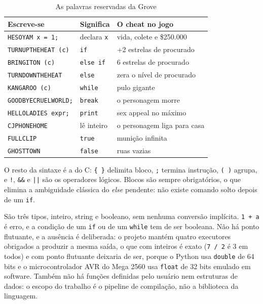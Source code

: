 \documentclass[conference]{IEEEtran}
\begin{document}
\begin{table}[htbp]
\caption{As palavras reservadas da Grove}
\label{tab:cheats}
\centering
\footnotesize
\setlength{\tabcolsep}{3pt}
\begin{tabular}{@{}lll@{}}
\toprule
\textbf{Escreve-se} & \textbf{Significa} & \textbf{O cheat no jogo} \\
\midrule
\texttt{HESOYAM x = 1;} & declara \texttt{x} & vida, colete e \$250.000 \\
\texttt{TURNUPTHEHEAT (c)} & \texttt{if} & +2 estrelas de procurado \\
\texttt{BRINGITON (c)} & \texttt{else if} & 6 estrelas de procurado \\
\texttt{TURNDOWNTHEHEAT} & \texttt{else} & zera o nível de procurado \\
\texttt{KANGAROO (c)} & \texttt{while} & pulo gigante \\
\texttt{GOODBYECRUELWORLD;} & \texttt{break} & o personagem morre \\
\texttt{HELLOLADIES expr;} & \texttt{print} & sex appeal no máximo \\
\texttt{CJPHONEHOME} & lê inteiro & o personagem liga para casa \\
\texttt{FULLCLIP} & \texttt{true} & munição infinita \\
\texttt{GHOSTTOWN} & \texttt{false} & ruas vazias \\
\bottomrule
\end{tabular}
\end{table}

O resto da sintaxe é a do C: \texttt{\{ \}} delimita bloco, \texttt{;} termina instrução, \texttt{( )} agrupa, e \texttt{!}, \texttt{\&\&} e \texttt{||} são os operadores lógicos. Blocos são sempre obrigatórios, o que elimina a ambiguidade clássica do \emph{else} pendente: não existe comando solto depois de um \texttt{if}.

São três tipos, inteiro, string e booleano, sem nenhuma conversão implícita. \texttt{1 + \textquotedbl a\textquotedbl} é erro, e a condição de um \texttt{if} ou de um \texttt{while} tem de ser booleana. Não há ponto flutuante, e a ausência é deliberada: o projeto mantém quatro executores obrigados a produzir a mesma saída, o que com inteiros é exato (\texttt{7 / 2} é 3 em todos) e com ponto flutuante deixaria de ser, porque o Python usa \texttt{double} de 64 bits e o microcontrolador AVR do Mega 2560 usa \texttt{float} de 32 bits emulado em software. Também não há funções definidas pelo usuário nem estruturas de dados: o escopo do trabalho é o pipeline de compilação, não a biblioteca da linguagem.
\end{document}
